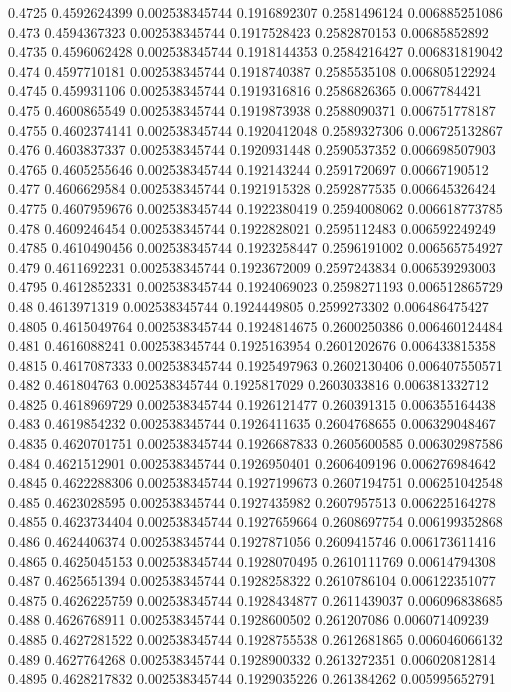 {0.4725 0.4592624399 0.002538345744 0.1916892307 0.2581496124 0.006885251086
0.473 0.4594367323 0.002538345744 0.1917528423 0.2582870153 0.00685852892
0.4735 0.4596062428 0.002538345744 0.1918144353 0.2584216427 0.006831819042
0.474 0.4597710181 0.002538345744 0.1918740387 0.2585535108 0.006805122924
0.4745 0.459931106 0.002538345744 0.1919316816 0.2586826365 0.0067784421
0.475 0.4600865549 0.002538345744 0.1919873938 0.2588090371 0.006751778187
0.4755 0.4602374141 0.002538345744 0.1920412048 0.2589327306 0.006725132867
0.476 0.4603837337 0.002538345744 0.1920931448 0.2590537352 0.006698507903
0.4765 0.4605255646 0.002538345744 0.192143244 0.2591720697 0.00667190512
0.477 0.4606629584 0.002538345744 0.1921915328 0.2592877535 0.006645326424
0.4775 0.4607959676 0.002538345744 0.1922380419 0.2594008062 0.006618773785
0.478 0.4609246454 0.002538345744 0.1922828021 0.2595112483 0.006592249249
0.4785 0.4610490456 0.002538345744 0.1923258447 0.2596191002 0.006565754927
0.479 0.4611692231 0.002538345744 0.1923672009 0.2597243834 0.006539293003
0.4795 0.4612852331 0.002538345744 0.1924069023 0.2598271193 0.006512865729
0.48 0.4613971319 0.002538345744 0.1924449805 0.2599273302 0.006486475427
0.4805 0.4615049764 0.002538345744 0.1924814675 0.2600250386 0.006460124484
0.481 0.4616088241 0.002538345744 0.1925163954 0.2601202676 0.006433815358
0.4815 0.4617087333 0.002538345744 0.1925497963 0.2602130406 0.006407550571
0.482 0.461804763 0.002538345744 0.1925817029 0.2603033816 0.006381332712
0.4825 0.4618969729 0.002538345744 0.1926121477 0.260391315 0.006355164438
0.483 0.4619854232 0.002538345744 0.1926411635 0.2604768655 0.006329048467
0.4835 0.4620701751 0.002538345744 0.1926687833 0.2605600585 0.006302987586
0.484 0.4621512901 0.002538345744 0.1926950401 0.2606409196 0.006276984642
0.4845 0.4622288306 0.002538345744 0.1927199673 0.2607194751 0.006251042548
0.485 0.4623028595 0.002538345744 0.1927435982 0.2607957513 0.006225164278
0.4855 0.4623734404 0.002538345744 0.1927659664 0.2608697754 0.006199352868
0.486 0.4624406374 0.002538345744 0.1927871056 0.2609415746 0.006173611416
0.4865 0.4625045153 0.002538345744 0.1928070495 0.2610111769 0.00614794308
0.487 0.4625651394 0.002538345744 0.1928258322 0.2610786104 0.006122351077
0.4875 0.4626225759 0.002538345744 0.1928434877 0.2611439037 0.006096838685
0.488 0.4626768911 0.002538345744 0.1928600502 0.261207086 0.006071409239
0.4885 0.4627281522 0.002538345744 0.1928755538 0.2612681865 0.006046066132
0.489 0.4627764268 0.002538345744 0.1928900332 0.2613272351 0.006020812814
0.4895 0.4628217832 0.002538345744 0.1929035226 0.261384262 0.005995652791
}
